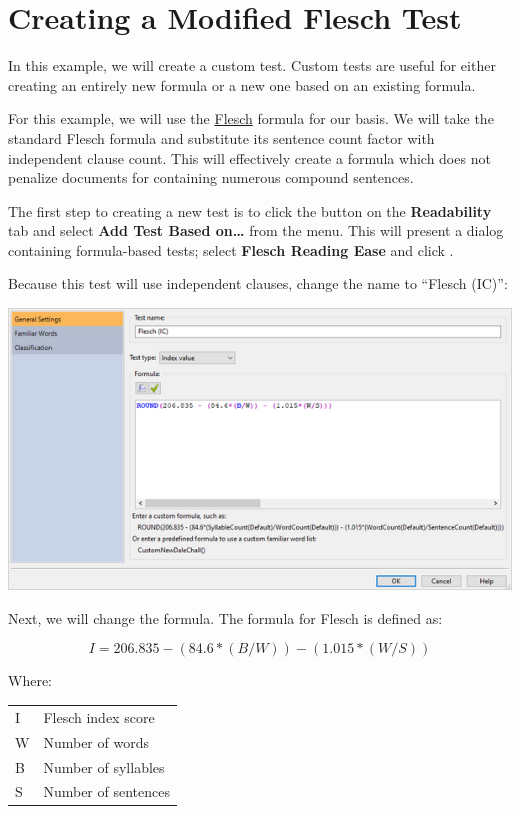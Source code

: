 \documentclass[
]{book}
\theoremstyle{definition}
\theoremstyle{definition}
\theoremstyle{definition}
\theoremstyle{definition}
\theoremstyle{remark}
\begin{document}
\hypertarget{creating-custom-flesch-test}{%
\section{\texorpdfstring{Creating a Modified Flesch Test}{Creating a Modified Flesch Test}}\label{creating-custom-flesch-test}}

In this example, we will create a custom test. Custom tests are useful for either creating an entirely new formula or a new one based on an existing formula.

For this example, we will use the \protect\hyperlink{flesch-test}{Flesch} formula for our basis. We will take the standard Flesch formula and substitute its sentence count factor with independent clause count. This will effectively create a formula which does not penalize documents for containing numerous compound sentences.

The first step to creating a new test is to click the  button on the \textbf{Readability} tab and select \textbf{Add Test Based on\ldots{}} from the menu. This will present a dialog containing formula-based tests; select \textbf{Flesch Reading Ease} and click .

Because this test will use independent clauses, change the name to ``Flesch (IC)'':

\includegraphics{Images/CustomTestExample1TestName.png}

Next, we will change the formula. The formula for Flesch is defined as:

\[
I = 206.835 - (84.6*(B/W)) - (1.015*(W/S))
\]

Where:

\begin{longtable}[]{@{}
  >{\raggedright\arraybackslash}p{}
  >{\raggedright\arraybackslash}p{}@{}}
\toprule
\endhead
I & Flesch index score \\
W & Number of words \\
B & Number of syllables \\
S & Number of sentences \\
\bottomrule
\end{longtable}
\end{document}

